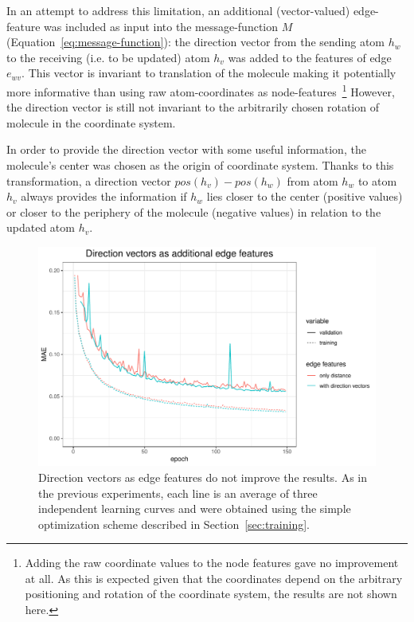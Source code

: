 In an attempt to address this limitation, an additional (vector-valued) edge-feature was included as input into the message-function $M$ (Equation~\ref{eq:message-function}): the direction vector from the sending atom $h_w$ to the receiving (i.e. to be updated) atom $h_v$ was added to the features of edge $e_{wv}$. This vector is invariant to translation of the molecule making it potentially more informative than using raw atom-coordinates as node-features~\footnote{Adding the raw coordinate values to the node features gave no improvement at all. As this is expected given that the coordinates depend on the arbitrary positioning and rotation of the coordinate system, the results are not shown here.} However, the direction vector is still not invariant to the arbitrarily chosen rotation of molecule in the coordinate system.

In order to provide the direction vector with some useful information, the molecule's center was chosen as the origin of coordinate system. Thanks to this transformation, a direction vector $pos(h_v) - pos(h_w)$ from atom $h_w$ to atom $h_v$ always provides the information if $h_w$ lies closer to the center (positive values) or closer to the periphery of the molecule (negative values) in relation to the updated atom $h_v$.

\begin{figure}[H]
	\includegraphics[width=\linewidth]{figures/edge-direction-vectors}
	\caption{Direction vectors as edge features do not improve the results. As in the previous experiments, each line is an average of three independent learning curves and were obtained using the simple optimization scheme described in Section~\ref{sec:training}.}
	\label{fig:edge-direction-vectors}
\end{figure}

